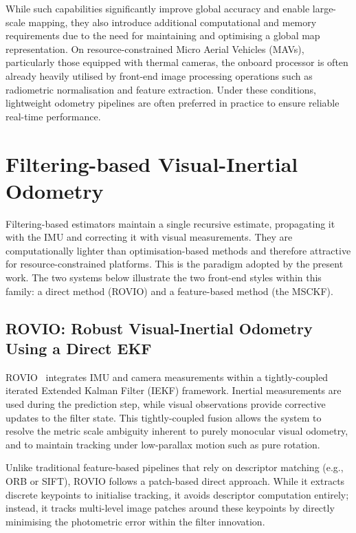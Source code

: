 While such capabilities significantly improve global accuracy and enable large-scale mapping, they also introduce additional computational and memory requirements due to the need for maintaining and optimising a global map representation. On resource-constrained Micro Aerial Vehicles (MAVs), particularly those equipped with thermal cameras, the onboard processor is often already heavily utilised by front-end image processing operations such as radiometric normalisation and feature extraction. Under these conditions, lightweight odometry pipelines are often preferred in practice to ensure reliable real-time performance.

\section{Filtering-based Visual-Inertial Odometry}
\label{sec:rw_filter}

Filtering-based estimators maintain a single recursive estimate, propagating it with the IMU and correcting it with visual measurements. They are computationally lighter than optimisation-based methods and therefore attractive for resource-constrained platforms. This is the paradigm adopted by the present work. The two systems below illustrate the two front-end styles within this family: a direct method (ROVIO) and a feature-based method (the MSCKF).

\subsection{ROVIO: Robust Visual-Inertial Odometry Using a Direct EKF}
ROVIO~\cite{Bloesch_2015} integrates IMU and camera measurements within a tightly-coupled iterated Extended Kalman Filter (IEKF) framework. Inertial measurements are used during the prediction step, while visual observations provide corrective updates to the filter state. This tightly-coupled fusion allows the system to resolve the metric scale ambiguity inherent to purely monocular visual odometry, and to maintain tracking under low-parallax motion such as pure rotation.

Unlike traditional feature-based pipelines that rely on descriptor matching (e.g., ORB or SIFT), ROVIO follows a patch-based direct approach. While it extracts discrete keypoints to initialise tracking, it avoids descriptor computation entirely; instead, it tracks multi-level image patches around these keypoints by directly minimising the photometric error within the filter innovation.

